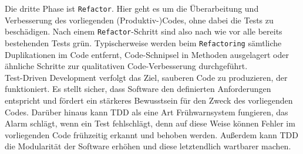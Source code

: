 Die dritte Phase ist \texttt{Refactor}. Hier geht es um die Überarbeitung und 
Verbesserung des vorliegenden (Produktiv-)Codes, ohne dabei die Tests zu beschädigen. 
Nach einem \texttt{Refactor}-Schritt sind also nach wie vor alle bereits bestehenden 
Tests grün. Typischerweise werden beim \texttt{Refactoring} sämtliche Duplikationen 
im Code entfernt, Code-Schnipsel in Methoden ausgelagert oder ähnliche Schritte zur 
qualitativen Code-Verbesserung durchgeführt. \\ 
Test-Driven Development verfolgt das Ziel, sauberen Code zu produzieren, der 
funktioniert. Es stellt sicher, dass Software den definierten Anforderungen entspricht 
und fördert ein stärkeres Bewusstsein für den Zweck des vorliegenden Codes. Darüber 
hinaus kann TDD als eine Art Frühwarnsystem fungieren, das Alarm schlägt, wenn ein 
Test fehlschlägt, denn auf diese Weise können Fehler im vorliegenden Code frühzeitig 
erkannt und behoben werden. Außerdem kann TDD die Modularität der Software erhöhen und 
diese letztendlich wartbarer machen. 

